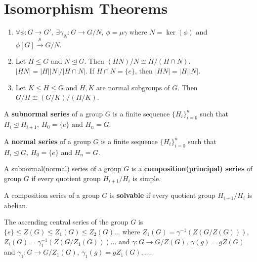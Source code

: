 \section{Isomorphism Theorems}
\begin{enumerate}
	\item $\forall \phi : G \to G',\ \exists \gamma_N : G \to G/N,\ \phi = \mu \gamma$ where $N = \ker(\phi)$ and $\phi[G] \overset{\mu}{\to} G/N$.
	\item Let $H \le G$ and $N \trianglelefteq G$. Then $(HN)/N \cong H/(H \cap N)$.
		\subitem $|HN| = |H| |N| / |H \cap N|$.
		\subitem If $H \cap N = \{ e \}$, then $|HN| = |H| |N|$.
	\item Let $K \le H \le G$ and $H,K$ are normal subgroups of $G$. Then $G/H \cong (G/K)/(H/K)$.
\end{enumerate}

\begin{definition}
	A \textbf{subnormal series} of a group $G$ is a finite sequence $\{ H_i \}_{i=0}^n$ such that $H_i \trianglelefteq H_{i+1},\ H_0 = \{ e \}$ and $H_n = G$.
\end{definition}

\begin{definition}
	A \textbf{normal series} of a group $G$ is a finite sequence $\{ H_i \}_{i=0}^n$ such that $H_i \trianglelefteq G,\ H_0 = \{ e \}$ and $H_n = G$.
\end{definition}

\begin{definition}
	A subnormal(normal) series of a group $G$ is a \textbf{composition(principal) series} of group $G$ if every quotient group $H_{i+1}/H_i$ is simple.
\end{definition}

\begin{definition}
	A composition series of a group $G$ is \textbf{solvable} if every quotient group $H_{i+1}/H_i$ is abelian.
\end{definition}

\begin{definition}
	The ascending central series of the group $G$ is $\{ e \} \le Z(G) \le Z_1(G) \le Z_2(G) \dots$ where $Z_1(G) = \gamma^{-1}(Z(G/Z(G)))$, $Z_i(G) = \gamma_1^{-1}(Z(G/Z_1(G))) \dots$ and $\gamma : G \to G/Z(G),\ \gamma(g) = gZ(G)$ and $\gamma_1 : G \to G/Z_1(G),\ \gamma_1(g) = gZ_1(G),\dots$.
\end{definition}

